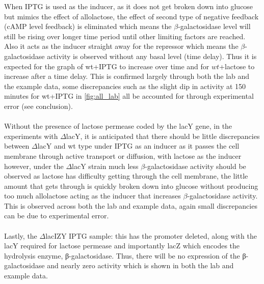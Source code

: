 \documentclass{article}
\begin{document}
When IPTG is used as the inducer, as it does not get broken down into glucose but mimics the effect of allolactose, the effect of second type of negative feedback (cAMP level feedback) is eliminated which means the $\beta$-galactosidase level will still be rising over longer time period until other limiting factors are reached. Also it acts as the inducer straight away for the repressor which means the $\beta$-galactosidase activity is observed without any basal level (time delay). Thus it is expected for the graph of wt+IPTG to increase over time and for $wt$+lactose to increase after a time delay. This is confirmed largely through both the lab and the example data, some discrepancies such as the slight dip in activity at 150 minutes for wt+IPTG in \ref{fig:all_lab} all be accounted for through experimental error (see conclusion).\\ \\
Without the presence of lactose permease coded by the lacY gene, in the experiments with $\Delta$lacY, it is anticipated that there should be little discrepancies between $\Delta$lacY and wt type under IPTG as an inducer as it passes the cell membrane through active transport or diffusion, with lactose as the inducer however, under the $\Delta$lacY strain much less $\beta$-galactosidase activity should be observed as lactose has difficulty getting through the cell membrane, the little amount that gets through is quickly broken down into glucose without producing too much allolactose acting as the inducer that increases $\beta$-galactosidase activity. This is observed across both the lab and example data, again small discrepancies can be due to experimental error.\\ \\
Lastly, the $\Delta$lacIZY IPTG sample: this has the promoter deleted, along with the lacY required for lactose permease and importantly lacZ which encodes the hydrolysis enzyme, β-galactosidase. Thus, there will be no expression of the β-galactosidase and nearly zero activity which is shown in both the lab and example data.
\end{document}
